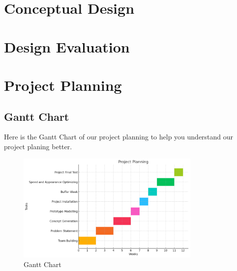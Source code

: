 \documentclass[12pt]{article}
\begin{document}
\section{Conceptual Design}
\section{Design Evaluation}

\section{Project Planning}
\subsection{Gantt Chart}
Here is the Gantt Chart of our project planning to help you understand our project planing better. 
\begin{figure}[h] %
    \centering %
    \includegraphics[width=0.8\textwidth]{figure/Picture1.png} %
    \caption{Gantt Chart} %
\end{figure}
\end{document}
